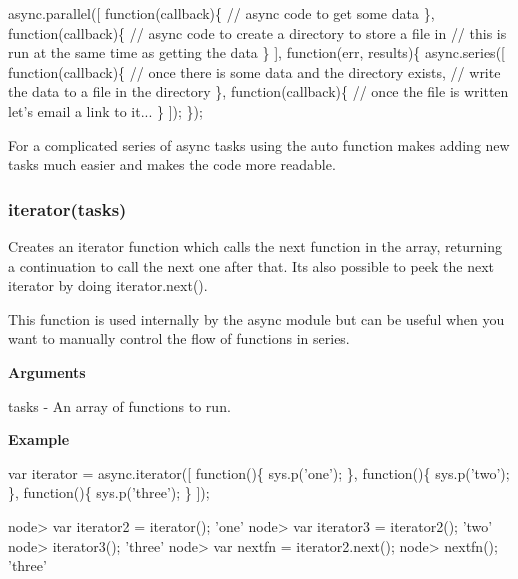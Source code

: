 \begin{DoxyCode}
async.parallel([
    \textcolor{keyword}{function}(callback)\{
        \textcolor{comment}{// async code to get some data}
    \},
    \textcolor{keyword}{function}(callback)\{
        \textcolor{comment}{// async code to create a directory to store a file in}
        \textcolor{comment}{// this is run at the same time as getting the data}
    \}
],
\textcolor{keyword}{function}(err, results)\{
    async.series([
        \textcolor{keyword}{function}(callback)\{
            \textcolor{comment}{// once there is some data and the directory exists,}
            \textcolor{comment}{// write the data to a file in the directory}
        \},
        \textcolor{keyword}{function}(callback)\{
            \textcolor{comment}{// once the file is written let's email a link to it...}
        \}
    ]);
\});
\end{DoxyCode}


For a complicated series of async tasks using the auto function makes adding new tasks much easier and makes the code more readable.





\label{_iterator}%
 \subsubsection*{iterator(tasks)}

Creates an iterator function which calls the next function in the array, returning a continuation to call the next one after that. It\textquotesingle{}s also possible to \textquotesingle{}peek\textquotesingle{} the next iterator by doing iterator.\+next().

This function is used internally by the async module but can be useful when you want to manually control the flow of functions in series.

{\bfseries Arguments}


\begin{DoxyItemize}
\item tasks -\/ An array of functions to run.
\end{DoxyItemize}

{\bfseries Example}


\begin{DoxyCode}
var iterator = async.iterator([
    \textcolor{keyword}{function}()\{ sys.p(\textcolor{stringliteral}{'one'}); \},
    \textcolor{keyword}{function}()\{ sys.p(\textcolor{stringliteral}{'two'}); \},
    \textcolor{keyword}{function}()\{ sys.p(\textcolor{stringliteral}{'three'}); \}
]);

node> var iterator2 = iterator();
\textcolor{stringliteral}{'one'}
node> var iterator3 = iterator2();
\textcolor{stringliteral}{'two'}
node> iterator3();
\textcolor{stringliteral}{'three'}
node> var nextfn = iterator2.next();
node> nextfn();
\textcolor{stringliteral}{'three'}
\end{DoxyCode}
 



